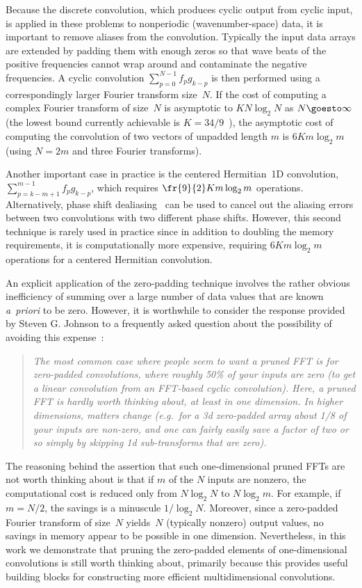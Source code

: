 \documentclass[final]{siamltex}
\begin{document}
Because the discrete convolution, which produces cyclic output from cyclic
input, is applied in these problems to nonperiodic (wavenumber-space) data,
it is important
to remove aliases from the convolution. Typically the input data arrays are
extended by padding them with enough zeros so that wave beats of
the positive frequencies cannot wrap around and contaminate
the negative frequencies. A cyclic convolution $\sum_{p=0}^{N-1} f_p g_{k-p}$ 
is then performed using a
correspondingly larger Fourier transform size~$N$. If the cost of 
computing a complex Fourier transform of size~$N$ is asymptotic to 
$K N\log_2 N$ as \hbox{$N\goesto\infty$} (the lowest bound currently 
achievable is $K=34/9$~\cite{Johnson07,Lundy07}), the asymptotic cost of
computing the convolution of two vectors of unpadded length $m$ is
$6Km\log_2 m$ (using $N=2m$ and three Fourier transforms).

Another important case in practice is the centered Hermitian~1D convolution,
$\sum_{p=k-m+1}^{m-1} f_p g_{k-p}$, which requires $\fr{9}{2}Km\log_2 m$
operations.
Alternatively, phase shift dealiasing~\cite{Patterson71,Canuto06} can be used
to cancel out the aliasing errors between two convolutions with two
different phase shifts. However, this second technique is rarely used in
practice since in addition to doubling the memory requirements, it is
computationally more expensive, requiring $6K m\log_2 m$ operations for a 
centered Hermitian convolution.

An explicit application of the zero-padding technique involves the rather
obvious inefficiency of summing over a large number of data values that
are known {\it a~priori\/} to be zero.
However, it is worthwhile to consider the response
provided by Steven G. Johnson to a frequently asked question about the
possibility of avoiding this expense~\cite{fftwprune}:
\begin{quotation}\label{Johnson}
{\it
The most common case where people seem to want a pruned FFT is for
zero-padded convolutions, where roughly 50\% of your inputs are zero (to
get a linear convolution from an FFT-based cyclic convolution). Here, a
pruned FFT is hardly worth thinking about, at least in one dimension. In
higher dimensions, matters change (e.g.\ for a 3d zero-padded array about
1/8 of your inputs are non-zero, and one can fairly easily save a factor of
two or so simply by skipping 1d sub-transforms that are zero).
}
\end{quotation}

The reasoning behind the assertion that such one-dimensional pruned FFTs
are not worth thinking about is that if $m$ of the $N$ inputs are nonzero,
the computational cost is reduced only from $N\log_2 N$ to $N\log_2 m$.
For example, if $m=N/2$, the savings is a minuscule $1/\log_2 N$.
Moreover, since a zero-padded Fourier transform of size~$N$ yields~$N$
(typically nonzero) output values, no savings in memory appear to be
possible in one dimension. Nevertheless, in this work we demonstrate that
pruning the zero-padded elements of one-dimensional convolutions is still
worth thinking about, primarily because this provides useful building blocks
for constructing more efficient multidimensional convolutions.
\end{document}
